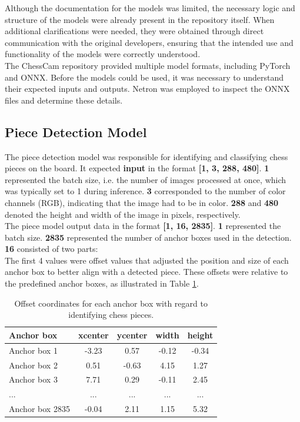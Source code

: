 Although the documentation for the models was limited, the necessary logic and structure of the models were already present in the repository itself. When additional clarifications were needed, they were obtained through direct communication with the original developers, ensuring that the intended use and functionality of the models were correctly understood. \\

The ChessCam repository provided multiple model formats, including PyTorch and ONNX. Before the models could be used, it was necessary to understand their expected inputs and outputs. Netron was employed to inspect the ONNX files and determine these details. \\

\newpage


\subsection{Piece Detection Model}
The piece detection model was responsible for identifying and classifying chess pieces on the board. It expected \textbf{input} in the format \textbf{[1, 3, 288, 480]}. \textbf{1} represented the batch size, i.e. the number of images processed at once, which was typically set to 1 during inference. \textbf{3} corresponded to the number of color channels (RGB), indicating that the image had to be in color. \textbf{288} and \textbf{480} denoted the height and width of the image in pixels, respectively. \\

The piece model output data in the format \textbf{[1, 16, 2835]}. \textbf{1} represented the batch size. \textbf{2835} represented the number of anchor boxes used in the detection. \textbf{16} consisted of two parts: \\

The first 4 values were offset values that adjusted the position and size of each anchor box to better align with a detected piece. These offsets were relative to the predefined anchor boxes, as illustrated in Table \ref{tab:piece-offset-table}.

\begin{table}[h]
    \centering
    \caption{Offset coordinates for each anchor box with regard to identifying chess pieces.}  %
    \renewcommand{\arraystretch}{1.5} %
    \begin{tabular}{lcccc}
        \toprule
        \textbf{Anchor box} & \textbf{xcenter} & \textbf{ycenter} & \textbf{width} & \textbf{height} \\
        \midrule
        Anchor box 1 & -3.23 & 0.57 & -0.12 & -0.34 \\
        Anchor box 2 & 0.51 & -0.63 & 4.15 & 1.27 \\
        Anchor box 3 & 7.71 & 0.29 & -0.11 & 2.45 \\
        ... & ... & ... & ... & ... \\
        Anchor box 2835 & -0.04 & 2.11 & 1.15 & 5.32 \\
        \bottomrule
    \end{tabular}
    \label{tab:piece-offset-table}
\end{table}


